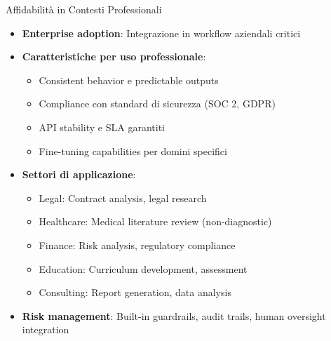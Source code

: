 \documentclass[aspectratio=169]{beamer}
\begin{document}
\begin{frame}{Affidabilità in Contesti Professionali}
\begin{itemize}
    \item \textbf{Enterprise adoption}: Integrazione in workflow aziendali critici
    \item \textbf{Caratteristiche per uso professionale}:
    \begin{itemize}
        \item Consistent behavior e predictable outputs
        \item Compliance con standard di sicurezza (SOC 2, GDPR)
        \item API stability e SLA garantiti
        \item Fine-tuning capabilities per domini specifici
    \end{itemize}
    \item \textbf{Settori di applicazione}:
    \begin{itemize}
        \item Legal: Contract analysis, legal research
        \item Healthcare: Medical literature review (non-diagnostic)
        \item Finance: Risk analysis, regulatory compliance
        \item Education: Curriculum development, assessment
        \item Consulting: Report generation, data analysis
    \end{itemize}
    \item \textbf{Risk management}: Built-in guardrails, audit trails, human oversight integration
\end{itemize}
\end{frame}
%
%
\end{document}
